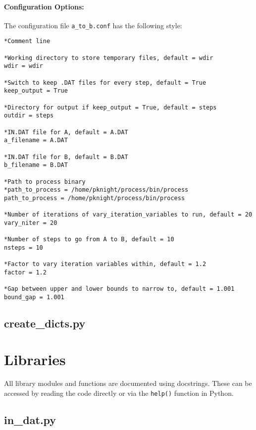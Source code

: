 \documentclass[11pt,a4paper]{report}
\begin{document}
\paragraph{Configuration Options:}

The configuration file \texttt{a\_to\_b.conf} has the following style:
\begin{framed}
\begin{verbatim}
*Comment line

*Working directory to store temporary files, default = wdir
wdir = wdir

*Switch to keep .DAT files for every step, default = True
keep_output = True

*Directory for output if keep_output = True, default = steps
outdir = steps

*IN.DAT file for A, default = A.DAT
a_filename = A.DAT

*IN.DAT file for B, default = B.DAT
b_filename = B.DAT

*Path to process binary
*path_to_process = /home/pknight/process/bin/process
path_to_process = /home/pknight/process/bin/process

*Number of iterations of vary_iteration_variables to run, default = 20
vary_niter = 20

*Number of steps to go from A to B, default = 10
nsteps = 10

*Factor to vary iteration variables within, default = 1.2
factor = 1.2

*Gap between upper and lower bounds to narrow to, default = 1.001
bound_gap = 1.001
\end{verbatim}
\end{framed}

\subsection{create\_dicts.py}


\section{Libraries}
\label{sec:py_lib}

All library modules and functions are documented using docstrings. These can
be accessed by reading the code directly or via the \texttt{help()} function
in Python.

\subsection{in\_dat.py}
\end{document}
